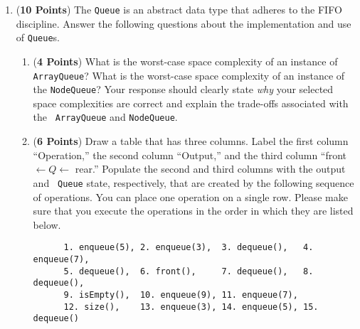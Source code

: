 \documentclass[12pt]{article}
\begin{document}
\begin{enumerate}
\begin{enumerate}
\end{enumerate}

\newpage

\item ({\bf 10 Points}) The {\tt Queue} is an abstract data type that
  adheres to the FIFO discipline.  Answer the following questions
  about the implementation and use of {\tt Queue}s.

  \begin{enumerate}
    
  \item ({\bf 4 Points}) What is the worst-case space complexity of an
    instance of {\tt ArrayQueue}?  What is the worst-case space
    complexity of an instance of the {\tt NodeQueue}?  Your response
    should clearly state {\em why} your selected space complexities
    are correct and explain the trade-offs associated with the {\tt
      ArrayQueue} and {\tt NodeQueue}.
    

  \item ({\bf 6 Points}) Draw a table that has three columns.  Label
    the first column ``Operation,'' the second column ``Output,'' and
    the third column ``front $\leftarrow Q \leftarrow$ rear.''
    Populate the second and third columns with the output and {\tt
    Queue} state, respectively, that are created by the following
    sequence of operations.  You can place one operation on a single
    row. Please make sure that you execute the operations in the order
    in which they are listed below.  \\

    \begin{verbatim}
      1. enqueue(5), 2. enqueue(3),  3. dequeue(),   4. enqueue(7), 
      5. dequeue(),  6. front(),     7. dequeue(),   8. dequeue(), 
      9. isEmpty(),  10. enqueue(9), 11. enqueue(7), 
      12. size(),    13. enqueue(3), 14. enqueue(5), 15. dequeue()
    \end{verbatim}


\end{enumerate}
\end{enumerate}
\end{document}
